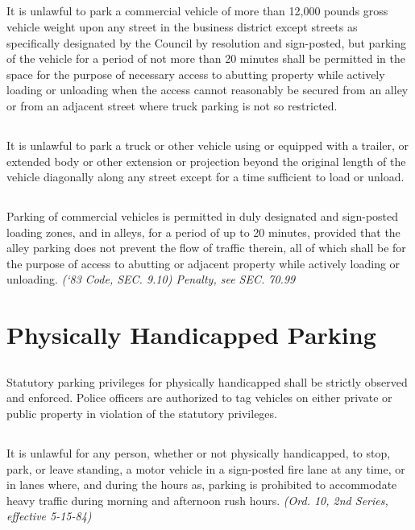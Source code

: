 \subsection{}
It is unlawful to park a commercial vehicle of more than 12,000 pounds gross vehicle weight upon any street in the business district except streets as specifically designated by the Council by resolution and sign-posted, but parking of the vehicle for a period of not more than 20 minutes shall be permitted in the space for the purpose of necessary access to abutting property while actively loading or unloading when the access cannot reasonably be secured from an alley or from an adjacent street where truck parking is not so restricted.
\subsection{}
It is unlawful to park a truck or other vehicle using or equipped with a trailer, or extended body or other extension or projection beyond the original length of the vehicle diagonally along any street except for a time sufficient to load or unload.
\subsection{}
Parking of commercial vehicles is permitted in duly designated and sign-posted loading zones, and in alleys, for a period of up to 20 minutes, provided that the alley parking does not prevent the flow of traffic therein, all of which shall be for the purpose of access to abutting or adjacent property while actively loading or unloading.\newline
\emph{(‘83 Code, SEC. 9.10)  Penalty, see SEC. 70.99}

\section{Physically Handicapped Parking}
\subsection{}
Statutory parking privileges for physically handicapped shall be strictly observed and enforced.  Police officers are authorized to tag vehicles on either private or public property in violation of the statutory privileges.
\subsection{}
It is unlawful for any person, whether or not physically handicapped, to stop, park, or leave standing, a motor vehicle in a sign-posted fire lane at any time, or in lanes where, and during the hours as, parking is prohibited to accommodate heavy traffic during morning and afternoon rush hours. \emph{(Ord. 10, 2nd Series, effective 5-15-84)}
